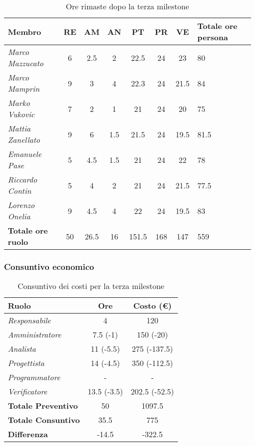 \begin{table}[H]
    \centering
    \begin{tabular}{|l|c|c|c|c|c|c|C{2.5cm}|}
    \hline
    \textbf{Membro} & \textbf{RE} & \textbf{AM} & \textbf{AN} & \textbf{PT} & \textbf{PR} & \textbf{VE} & \textbf{Totale ore persona} \\ \hline
    \textit{Marco Mazzucato}  & 6  & 2.5  & 2    & 22.5  & 24  & 23     & 80     \\ \hline
    \textit{Marco Mamprin}    & 9  & 3    & 4    & 22.3  & 24  & 21.5   & 84     \\ \hline
    \textit{Marko Vukovic}    & 7  & 2    & 1    & 21    & 24  & 20     & 75     \\ \hline
    \textit{Mattia Zanellato} & 9  & 6    & 1.5  & 21.5  & 24  & 19.5   & 81.5   \\ \hline
    \textit{Emanuele Pase}    & 5  & 4.5  & 1.5  & 21    & 24  & 22     & 78     \\ \hline
    \textit{Riccardo Contin}  & 5  & 4    & 2    & 21    & 24  & 21.5   & 77.5   \\ \hline
    \textit{Lorenzo Onelia}   & 9  & 4.5  & 4    & 22    & 24  & 19.5   & 83     \\ \hline
    \textbf{Totale ore ruolo} & 50 & 26.5 & 16   & 151.5 & 168 & 147    & 559    \\ \hline
    \end{tabular}
    \caption{Ore rimaste dopo la terza milestone}
\end{table}

\subsubsection{Consuntivo economico}

\begin{table}[H]
    \centering
    \begin{tabular}{|l|c|c|}
    \hline
    \textbf{Ruolo} & \textbf{Ore} & \textbf{Costo (€)} \\ \hline
    \textit{Responsabile}      & 4           & 120            \\ \hline
    \textit{Amministratore}    & 7.5 (-1)    & 150 (-20)      \\ \hline
    \textit{Analista}          & 11 (-5.5)   & 275 (-137.5)   \\ \hline
    \textit{Progettista}       & 14 (-4.5)   & 350 (-112.5)   \\ \hline
    \textit{Programmatore}     & -           & -              \\ \hline
    \textit{Verificatore}      & 13.5 (-3.5) & 202.5 (-52.5)  \\ \hline
    \textbf{Totale Preventivo} & 50          & 1097.5         \\ \hline
    \textbf{Totale Consuntivo} & 35.5        & 775            \\ \hline
    \textbf{Differenza}        & -14.5       & -322.5         \\ \hline
    \end{tabular}
    \caption{Consuntivo dei costi per la terza milestone}
\end{table}

